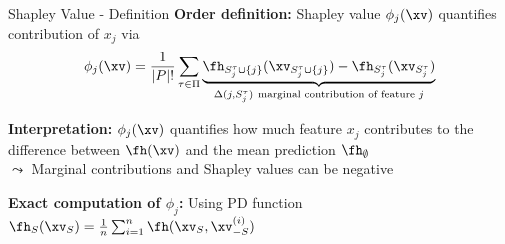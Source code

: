 \documentclass[10pt,compress,t,notes=noshow, xcolor=table]{beamer}
\newcommand{\Stau}{S_{j}^\tau}%
\newcommand{\Stauj}{\Stau \cup \{j\}}
\begin{document}



\begin{framev}[align=top]{Shapley Value - Definition  }
\textbf{Order definition:} Shapley value $\phi_j(\xv)$ quantifies contribution of $x_j$ via
$$
\phi_j(\xv) = \frac{1}{|P|!} \sum_{\tau \in \Pi} \underbrace{\fh_{\Stauj}(\xv_{\Stauj}) - \fh_{\Stau}(\xv_{\Stau})}_{\Delta(j, \Stau)~\text{marginal contribution of feature $j$}}
$$ %
\begin{itemizeM}
\item \textbf{Interpretation:} $\phi_j(\xv)$ quantifies how much feature $x_j$ contributes to the difference between $\fh(\xv)$ and the mean prediction $\fh_\emptyset$\\
$\leadsto$ Marginal contributions and Shapley values can be negative
\item \textbf{Exact computation of $\phi_j$:} Using PD function
$\fh_S(\xv_S) = \frac{1}{n} \sum_{i=1}^n \fh(\xv_S, \xv_{-S}^{(i)})$

\end{itemizeM}
\end{framev}
\end{document}
